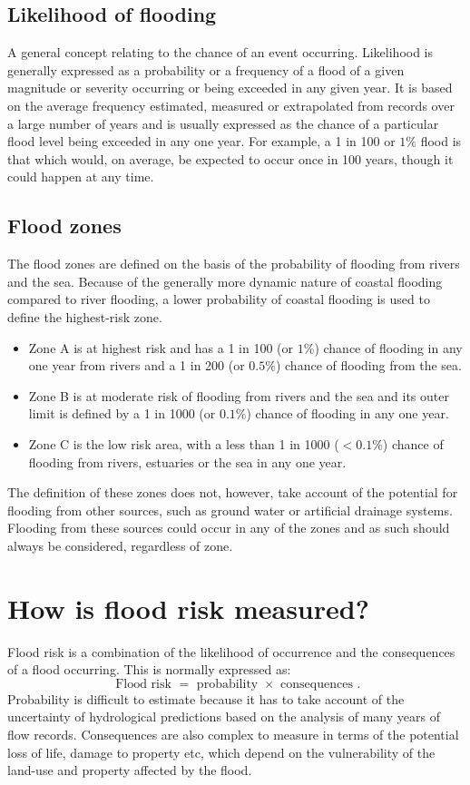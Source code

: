 \documentclass[12pt, a4paper]{article}
\theoremstyle{plain}
\theoremstyle{definition}
\theoremstyle{remark}
\begin{document}
\subsection{ Likelihood of flooding}
A general concept relating to the chance of an event occurring. Likelihood is generally expressed as a probability or a frequency of a flood of a given
magnitude or severity occurring or being exceeded in any given year. It is based on the average frequency estimated, measured or extrapolated from records over a large number of years and is usually expressed as the chance of a particular flood level being exceeded
in any one year. For example, a 1 in 100 or $1\%$ flood is that which would, on average, be expected to occur
once in 100 years, though it could happen at any time.

\subsection{ Flood zones}

The flood zones are defined on the basis of the probability of flooding from
rivers and the sea. Because of the generally more dynamic nature of coastal
flooding compared to river flooding, a lower probability of coastal flooding is
used to define the highest-risk zone.
\begin{itemize}
\item Zone A is at highest risk and has a 1 in 100 (or $1\%$) chance of flooding in any
one year from rivers and a 1 in 200 (or $0.5\%$) chance of flooding from the
sea.
\item Zone B is at moderate risk of flooding from rivers and the sea and its outer limit
is defined by a 1 in 1000 (or $0.1\%$) chance of flooding in any one year.
\item Zone C is the low risk area, with a less than 1 in 1000 ($<0.1\%$) chance of
flooding from rivers, estuaries or the sea in any one year.
\end{itemize}
The definition of these zones does not, however, take account of the potential
for flooding from other sources, such as ground water or artificial drainage
systems. Flooding from these sources could occur in any of the zones and as
such should always be considered, regardless of zone.

\section{ How is flood risk measured?}
Flood risk is a combination of the likelihood of occurrence and the consequences of a flood occurring. This is normally expressed as:
\[ \mbox{ Flood risk } = \mbox{ probability } \times \mbox { consequences }.\]
Probability is difficult to estimate because it has to take account of the uncertainty of hydrological predictions based on the analysis of many years of flow records. Consequences are also complex to measure in terms of the
potential loss of life, damage to property etc, which depend on the vulnerability of the land-use and property affected by the flood.
\end{document}
